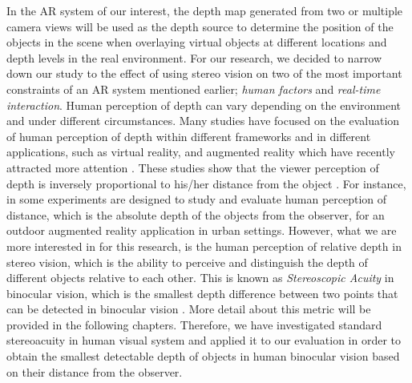 \documentclass[12pt]{report}
\begin{document}
In the AR system of our interest, the depth map generated from two or multiple camera views will be used as the depth source to determine the position of the objects in the scene when
overlaying virtual objects at different locations and depth levels in the real environment. For our research, we decided to narrow down our study to the effect of using stereo vision
on two of the most important constraints of an AR system mentioned earlier; {\it human factors} and {\it real-time interaction}. {\newline}
Human perception of depth can vary depending on the environment and under different circumstances. Many studies have focused on the evaluation of human perception of depth within different frameworks
and in different applications, such as virtual reality, and augmented reality which have recently attracted more attention \cite{wann95,dras96,liv05,jer05,swa07,kru10}.
These studies show that the viewer perception of depth
is inversely proportional to his/her distance from the object \cite{kru10,swa07,jer05,liv05}. For instance, in \cite{swa07} some experiments are designed to study and evaluate human
perception of distance, which is the absolute depth of the objects from the observer, for an outdoor augmented reality application in urban settings. 
However, what we are more interested in for this research, is the human perception of relative depth in stereo vision, which is the ability to perceive and distinguish 
the depth of different objects relative to each other. This is known as {\it Stereoscopic Acuity} in binocular vision, which is the smallest depth difference between two points 
that can be detected in binocular vision \cite{pfa2000}. More detail about
this metric will be provided in the following chapters.
Therefore, we have investigated standard stereoacuity in human visual system and applied it to our evaluation in order to obtain the smallest detectable depth of 
objects in human binocular vision based on their distance from the observer.
\end{document}
